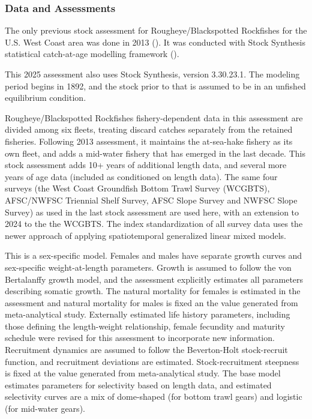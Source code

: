 \documentclass[
]{scrartcl}
\begin{document}
\subsubsection{Data and Assessments}\label{data-and-assessments}

The only previous stock assessment for Rougheye/Blackspotted Rockfishes
for the U.S. West Coast area was done in 2013
(). It
was conducted with Stock Synthesis statistical catch-at-age modelling
framework ().

This 2025 assessment also uses Stock Synthesis, version 3.30.23.1. The
modeling period begins in 1892, and the stock prior to that is assumed
to be in an unfished equilibrium condition.

Rougheye/Blackspotted Rockfishes fishery-dependent data in this
assessment are divided among six fleets, treating discard catches
separately from the retained fisheries. Following 2013 assessment, it
maintains the at-sea-hake fishery as its own fleet, and adds a mid-water
fishery that has emerged in the last decade. This stock assessment adds
10+ years of additional length data, and several more years of age data
(included as conditioned on length data). The same four surveys (the
West Coast Groundfish Bottom Trawl Survey (WCGBTS), AFSC/NWFSC Triennial
Shelf Survey, AFSC Slope Survey and NWFSC Slope Survey) as used in the
last stock assessment are used here, with an extension to 2024 to the
the WCGBTS. The index standardization of all survey data uses the newer
approach of applying spatiotemporal generalized linear mixed models.

This is a sex-specific model. Females and males have separate growth
curves and sex-specific weight-at-length parameters. Growth is assumed
to follow the von Bertalanffy growth model, and the assessment
explicitly estimates all parameters describing somatic growth. The
natural mortality for females is estimated in the assessment and natural
mortality for males is fixed an the value generated from meta-analytical
study. Externally estimated life history parameters, including those
defining the length-weight relationship, female fecundity and maturity
schedule were revised for this assessment to incorporate new
information. Recruitment dynamics are assumed to follow the
Beverton-Holt stock-recruit function, and recruitment deviations are
estimated. Stock-recruitment steepness is fixed at the value generated
from meta-analytical study. The base model estimates parameters for
selectivity based on length data, and estimated selectivity curves are a
mix of dome-shaped (for bottom trawl gears) and logistic (for mid-water
gears).
\end{document}
